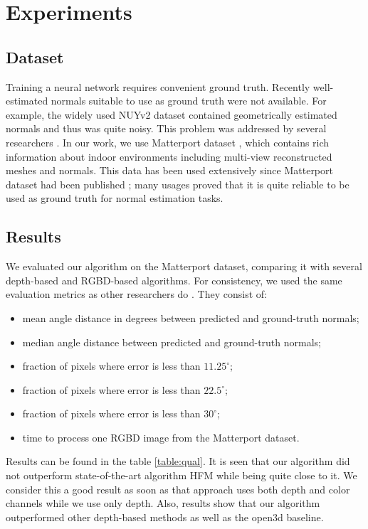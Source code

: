 \chapter{Experiments} \label{exp}

\section{Dataset}

Training a neural network requires convenient ground truth. Recently well-estimated normals suitable to use as ground truth were not available. For example, the widely used NUYv2 dataset contained geometrically estimated normals and thus was quite noisy. This problem was addressed by several researchers \cite{matterport, physically-based-rendering}. In our work, we use Matterport dataset \cite{matterport}, which contains rich information about indoor environments including multi-view reconstructed meshes and normals. This data has been used extensively since Matterport dataset had been published \cite{deep_surf, deep_depth_compl}; many usages proved that it is quite reliable to be used as ground truth for normal estimation tasks.

\section{Results}

We evaluated our algorithm on the Matterport dataset, comparing it with several depth-based and RGBD-based algorithms. For consistency, we used the same evaluation metrics as other researchers do \cite{deep_surf, deep_depth_compl}. They consist of:
\begin{itemize}
    \item mean angle distance in degrees between predicted and ground-truth normals;
    \item median angle distance between predicted and ground-truth normals;
    \item fraction of pixels where error is less than $11.25^{\circ}$;
    \item fraction of pixels where error is less than $22.5^{\circ}$;
    \item fraction of pixels where error is less than $30^{\circ}$;
    \item time to process one RGBD image from the Matterport dataset.
\end{itemize}

Results can be found in the table \ref{table:qual}. It is seen that our algorithm did not outperform state-of-the-art algorithm HFM \cite{deep_surf} while being quite close to it. We consider this a good result as soon as that approach uses both depth and color channels while we use only depth. Also, results show that our algorithm outperformed other depth-based methods as well as the open3d \cite{open3d} baseline.

